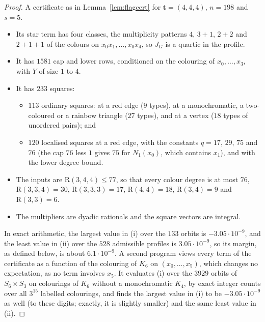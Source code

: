 \documentclass[11pt]{article}
\theoremstyle{spacedplain}
\theoremstyle{spaceddef}
\theoremstyle{spacedremark}
\newcommand{\R}{\mathrm{R}}
\newcommand{\bt}{\mathbf{t}}
\begin{document}
\begin{proof}
A certificate as in Lemma~\ref{lem:flagcert} for $\bt=(4,4,4)$, $n=198$ and $s=5$.
\begin{itemize}
\item Its star term has four classes, the multiplicity patterns $4$, $3{+}1$, $2{+}2$ and $2{+}1{+}1$ of the colours on $x_0x_1,\dots,x_0x_4$, so $J_G$ is a quartic in the profile.
\item It has $1581$ cap and lower rows, conditioned on the colouring of $x_0,\dots,x_3$, with $Y$ of size $1$ to $4$.
\item It has $233$ squares:
\begin{itemize}
\item $113$ ordinary squares: at a red edge ($9$ types), at a monochromatic, a two-coloured or a rainbow triangle ($27$ types), and at a vertex ($18$ types of unordered pairs); and
\item $120$ localised squares at a red edge, with the constants $q=17$, $29$, $75$ and $76$ (the cap $76$ less $1$ gives $75$ for $N_1(x_0)$, which contains $x_1$), and with the lower degree bound.
\end{itemize}
\item The inputs are $\R(3,4,4)\le 77$, so that every colour degree is at most $76$, $\R(3,3,4)=30$, $\R(3,3,3)=17$, $\R(4,4)=18$, $\R(3,4)=9$ and $\R(3,3)=6$.
\item The multipliers are dyadic rationals and the square vectors are integral.
\end{itemize}
In exact arithmetic, the largest value in (i) over the $133$ orbits is $-3.05\cdot 10^{-9}$, and the least value in (ii) over the $528$ admissible profiles is $3.05\cdot 10^{-9}$, so its margin, as defined below, is about $6.1\cdot 10^{-9}$.
A second program views every term of the certificate as a function of the colouring of $K_6$ on $(x_0,\dots,x_5)$, which changes no expectation, as no term involves $x_5$.
It evaluates (i) over the $3929$ orbits of $S_6\times S_3$ on colourings of $K_6$ without a monochromatic $K_4$, by exact integer counts over all $3^{15}$ labelled colourings, and finds the largest value in (i) to be $-3.05\cdot 10^{-9}$ as well (to these digits; exactly, it is slightly smaller) and the same least value in (ii).
\end{proof}
\end{document}
